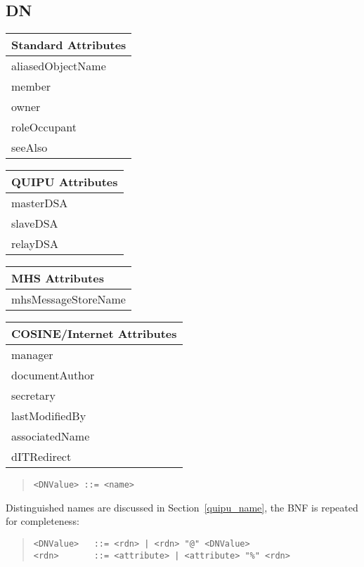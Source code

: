 \subsection{DN}
\begin{center}\small
\begin{tabular}{|l|}\hline
Standard Attributes \\ \hline
	aliasedObjectName\\
	member\\
	owner\\
	roleOccupant\\
	seeAlso\\
\hline
\end{tabular}
\begin{tabular}{|l|}\hline
QUIPU Attributes \\ \hline
	masterDSA\\
	slaveDSA\\
	relayDSA\\
\hline
\end{tabular}
\end{center}

\begin{center}\small\begin{tabular}{|l|}\hline
MHS Attributes \\ \hline
	mhsMessageStoreName\\
\hline
\end{tabular}
\begin{tabular}{|l|}\hline
COSINE/Internet Attributes \\ \hline
	manager\\ 
	documentAuthor\\
	secretary\\
	lastModifiedBy\\
	associatedName\\
	dITRedirect\\
\hline
\end{tabular}
\end{center}

\begin{quote}\begin{verbatim}
<DNValue> ::= <name>
\end{verbatim}\end{quote}
Distinguished names are discussed in Section~\ref{quipu_name}, the BNF is
repeated for completeness:
\begin{quote}\begin{verbatim}
<DNValue>	::= <rdn> | <rdn> "@" <DNValue>
<rdn>		::= <attribute> | <attribute> "%" <rdn>
\end{verbatim}\end{quote}

